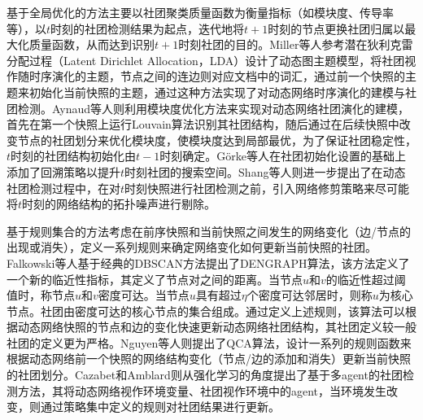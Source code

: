 基于全局优化的方法主要以社团聚类质量函数为衡量指标（如模块度、传导率等），以$t$时刻的社团检测结果为起点，迭代地将$t+1$时刻的节点更换社团归属以最大化质量函数，从而达到识别$t+1$时刻社团的目的。Miller等人\cite{miller2010continuous}参考潜在狄利克雷分配过程（Latent Dirichlet Allocation，LDA）设计了动态图主题模型，将社团视作随时序演化的主题，节点之间的连边则对应文档中的词汇，通过前一个快照的主题来初始化当前快照的主题，通过这种方法实现了对动态网络时序演化的建模与社团检测。Aynaud等\cite{aynaud2010static}人则利用模块度优化方法来实现对动态网络社团演化的建模，首先在第一个快照上运行Louvain算法识别其社团结构，随后通过在后续快照中改变节点的社团划分来优化模块度，使模块度达到局部最优，为了保证社团稳定性，$t$时刻的社团结构初始化由$t-1$时刻确定。G{\"o}rke等人\cite{gorke2010modularity}在社团初始化设置的基础上添加了回溯策略以提升$t$时刻社团的搜索空间。Shang等人\cite{shang2014real}则进一步提出了在动态社团检测过程中，在对$t$时刻快照进行社团检测之前，引入网络修剪策略来尽可能将$t$时刻的网络结构的拓扑噪声进行剔除。  

基于规则集合的方法考虑在前序快照和当前快照之间发生的网络变化（边/节点的出现或消失），定义一系列规则来确定网络变化如何更新当前快照的社团。Falkowski等人\cite{falkowski2008studying}基于经典的DBSCAN\cite{10486339}方法提出了DENGRAPH算法，该方法定义了一个新的临近性指标，其定义了节点对之间的距离。当节点$u$和$v$的临近性超过阈值时，称节点$u$和$v$密度可达。当节点$u$具有超过$\eta$个密度可达邻居时，则称$u$为核心节点。社团由密度可达的核心节点的集合组成。通过定义上述规则，该算法可以根据动态网络快照的节点和边的变化快速更新动态网络社团结构，其社团定义较一般社团的定义更为严格。Nguyen等人\cite{nguyen2011adaptive}则提出了QCA算法，设计一系列的规则函数来根据动态网络前一个快照的网络结构变化（节点/边的添加和消失）更新当前快照的社团划分。Cazabet和Amblard\cite{cazabet2011simulate}则从强化学习的角度提出了基于多agent的社团检测方法，其将动态网络视作环境变量、社团视作环境中的agent，当环境发生改变，则通过策略集中定义的规则对社团结果进行更新。

